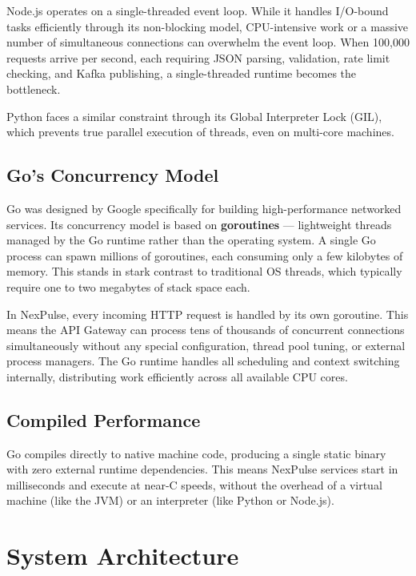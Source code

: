 \documentclass[12pt,a4paper]{article}
\begin{document}
Node.js operates on a single-threaded event loop. While it handles I/O-bound tasks efficiently through its non-blocking model, CPU-intensive work or a massive number of simultaneous connections can overwhelm the event loop. When 100,000 requests arrive per second, each requiring JSON parsing, validation, rate limit checking, and Kafka publishing, a single-threaded runtime becomes the bottleneck.

Python faces a similar constraint through its Global Interpreter Lock (GIL), which prevents true parallel execution of threads, even on multi-core machines.

\subsection{Go's Concurrency Model}

Go was designed by Google specifically for building high-performance networked services. Its concurrency model is based on \textbf{goroutines} --- lightweight threads managed by the Go runtime rather than the operating system. A single Go process can spawn millions of goroutines, each consuming only a few kilobytes of memory. This stands in stark contrast to traditional OS threads, which typically require one to two megabytes of stack space each.

In NexPulse, every incoming HTTP request is handled by its own goroutine. This means the API Gateway can process tens of thousands of concurrent connections simultaneously without any special configuration, thread pool tuning, or external process managers. The Go runtime handles all scheduling and context switching internally, distributing work efficiently across all available CPU cores.

\subsection{Compiled Performance}

Go compiles directly to native machine code, producing a single static binary with zero external runtime dependencies. This means NexPulse services start in milliseconds and execute at near-C speeds, without the overhead of a virtual machine (like the JVM) or an interpreter (like Python or Node.js).

\section{System Architecture}
\end{document}
